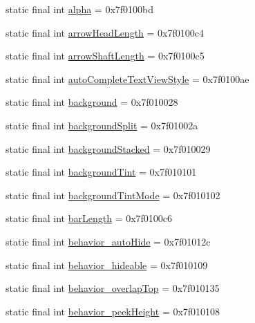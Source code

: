 \begin{CompactItemize}
\item 
static final int \hyperlink{classandroid_1_1support_1_1v4_1_1_r_1_1attr_17db9a47856593299445645746937cfc}{alpha} = 0x7f0100bd
\item 
static final int \hyperlink{classandroid_1_1support_1_1v4_1_1_r_1_1attr_d0136c27c4144aa3a561668b5757ec4a}{arrowHeadLength} = 0x7f0100c4
\item 
static final int \hyperlink{classandroid_1_1support_1_1v4_1_1_r_1_1attr_df84cadc0198607eba25c6db99ed4d9e}{arrowShaftLength} = 0x7f0100c5
\item 
static final int \hyperlink{classandroid_1_1support_1_1v4_1_1_r_1_1attr_bcc261aa8274e44785ef92363792c069}{autoCompleteTextViewStyle} = 0x7f0100ae
\item 
static final int \hyperlink{classandroid_1_1support_1_1v4_1_1_r_1_1attr_8862d5296a9154cb30b8b54d7da3abfd}{background} = 0x7f010028
\item 
static final int \hyperlink{classandroid_1_1support_1_1v4_1_1_r_1_1attr_2ae66bb3fea2057686b3d65927bfee86}{backgroundSplit} = 0x7f01002a
\item 
static final int \hyperlink{classandroid_1_1support_1_1v4_1_1_r_1_1attr_75bf34978867c32d8c16c06be8fdf929}{backgroundStacked} = 0x7f010029
\item 
static final int \hyperlink{classandroid_1_1support_1_1v4_1_1_r_1_1attr_10302b9e509eeb7d065933f291728fa4}{backgroundTint} = 0x7f010101
\item 
static final int \hyperlink{classandroid_1_1support_1_1v4_1_1_r_1_1attr_eff75e05950e4768c976095bd54d08bf}{backgroundTintMode} = 0x7f010102
\item 
static final int \hyperlink{classandroid_1_1support_1_1v4_1_1_r_1_1attr_9a1758cb9a6bcf18ab9ab3a33161d0b8}{barLength} = 0x7f0100c6
\item 
static final int \hyperlink{classandroid_1_1support_1_1v4_1_1_r_1_1attr_5d80f4332c900bc4402514d2005494a3}{behavior\_\-autoHide} = 0x7f01012c
\item 
static final int \hyperlink{classandroid_1_1support_1_1v4_1_1_r_1_1attr_a3524b9e50fbda6623397d9348094e21}{behavior\_\-hideable} = 0x7f010109
\item 
static final int \hyperlink{classandroid_1_1support_1_1v4_1_1_r_1_1attr_82f77fc0b1101f1d4ad4f18f9ae446b1}{behavior\_\-overlapTop} = 0x7f010135
\item 
static final int \hyperlink{classandroid_1_1support_1_1v4_1_1_r_1_1attr_a072373bb362000b381bfebbff9a417e}{behavior\_\-peekHeight} = 0x7f010108
\item 

\end{CompactItemize}
